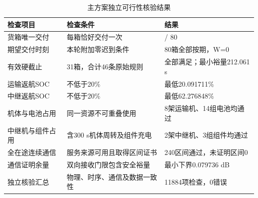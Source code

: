\begin{table}[!htbp]
\centering
\footnotesize
\setlength{\tabcolsep}{3pt}
\renewcommand{\arraystretch}{1.10}
\caption{主方案独立可行性核验结果}\label{tab:q3-checks}
\begin{tabular}{@{}>{\raggedright\arraybackslash}p{3.10cm}>{\raggedright\arraybackslash}p{5.80cm}>{\raggedright\arraybackslash}p{6.60cm}@{}}
\toprule
检查项目 & 检查条件 & 结果 \\
\midrule
货箱唯一交付 & 每箱恰好交付一次 & 80 / 80 \\
期望交付时刻 & 本轮附加零迟到条件 & 80箱全部按期，W=0 \\
有效硬截止 & 31箱，合计46条原始规则 & 全部满足；最小裕量212.061 s \\
运输返航SOC & 不低于20\% & 最低20.091711\% \\
中继返航SOC & 不低于20\% & 最低62.276848\% \\
机体与电池占用 & 同一资源不可重叠使用 & 8架运输机、14组电池均通过 \\
中继机与组件占用 & 含300 s机体周转及组件充电 & 2架中继机、3组组件均通过 \\
全在途连续通信 & 服务来源可用且取得区间证书 & 240区间通过，未证明区间0 \\
通信证明余量 & 双向接收门限包含安全裕量 & 最小下界0.079736 dB \\
独立核验汇总 & 物理、时序、通信及数据一致性 & 11884项检查，0错误 \\
\bottomrule
\end{tabular}
\end{table}
